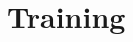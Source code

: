 \documentclass[conference]{IEEEtran}
\begin{document}
\begin{table}[!tb]
\begin{tabular}{l cccc cccc cccc}
        \bottomrule
    \end{tabular}
\end{table}


\section{Training}
\label{sec:training}
\end{document}

